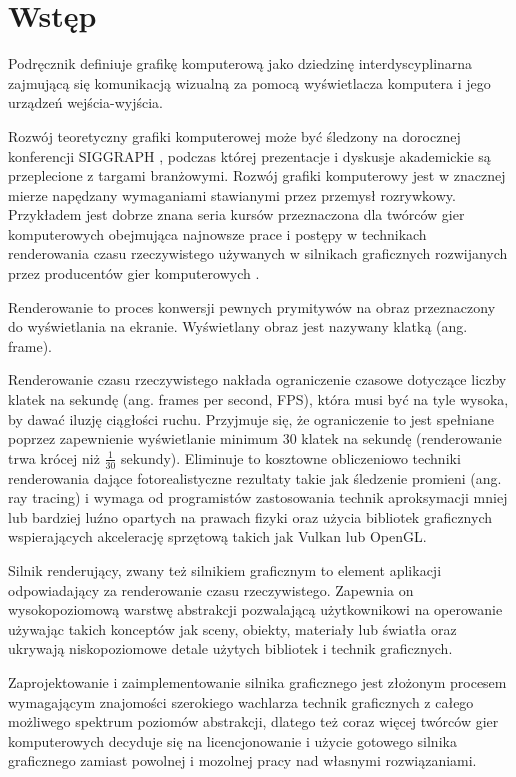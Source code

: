 \chapter{Wstęp}
\label{chap:introduction}

Podręcznik \cite{HughesDamEtAl13} definiuje grafikę komputerową jako dziedzinę interdyscyplinarna zajmującą się komunikacją wizualną za pomocą wyświetlacza komputera i jego urządzeń wejścia-wyjścia.

Rozwój teoretyczny grafiki komputerowej może być śledzony na dorocznej konferencji SIGGRAPH \cite{SIGGRAPH}, podczas której prezentacje i dyskusje akademickie są przeplecione z targami branżowymi.
Rozwój grafiki komputerowy jest w znacznej mierze napędzany wymaganiami stawianymi przez przemysł rozrywkowy. Przykładem jest dobrze znana seria kursów przeznaczona dla twórców gier komputerowych obejmująca najnowsze prace i postępy w technikach renderowania czasu rzeczywistego używanych w silnikach graficznych rozwijanych przez producentów gier komputerowych \cite{SIGGRAPH_ADVANCES}.

Renderowanie to proces konwersji pewnych prymitywów na obraz przeznaczony do wyświetlania na ekranie.
Wyświetlany obraz jest nazywany klatką (ang. frame).

Renderowanie czasu rzeczywistego nakłada ograniczenie czasowe dotyczące liczby klatek na sekundę (ang. frames per second, FPS), która musi być na tyle wysoka, by dawać iluzję ciągłości ruchu.
Przyjmuje się, że ograniczenie to jest spełniane poprzez zapewnienie wyświetlanie minimum 30 klatek na sekundę (renderowanie trwa krócej niż $\frac{1}{30}$ sekundy).
Eliminuje to kosztowne obliczeniowo techniki renderowania dające fotorealistyczne rezultaty takie jak śledzenie promieni (ang. ray tracing) i wymaga od programistów zastosowania technik aproksymacji mniej lub bardziej luźno opartych na prawach fizyki oraz użycia bibliotek graficznych wspierających akcelerację sprzętową takich jak Vulkan lub OpenGL.

Silnik renderujący, zwany też silnikiem graficznym to element aplikacji odpowiadający za renderowanie czasu rzeczywistego. Zapewnia on wysokopoziomową warstwę abstrakcji pozwalającą użytkownikowi na operowanie używając takich konceptów jak sceny, obiekty, materiały lub światła oraz ukrywają niskopoziomowe detale użytych bibliotek i technik graficznych.

Zaprojektowanie i zaimplementowanie silnika graficznego jest złożonym procesem wymagającym znajomości szerokiego wachlarza technik graficznych z całego możliwego spektrum poziomów abstrakcji, dlatego też coraz więcej twórców gier komputerowych decyduje się na licencjonowanie i użycie gotowego silnika graficznego zamiast powolnej i mozolnej pracy nad własnymi rozwiązaniami.


